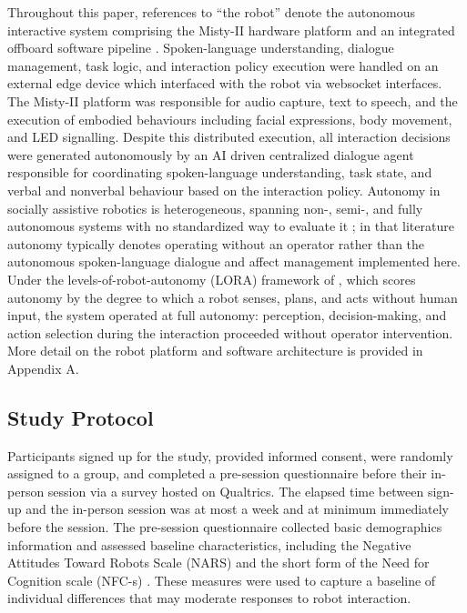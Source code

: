 \documentclass[
  authoryear,
  doubleblind,
  3p]{elsarticle}
\begin{document}
Throughout this paper, references to ``the robot'' denote the autonomous
interactive system comprising the Misty-II hardware platform and an
integrated offboard software pipeline \citep{mistyrobotics}.
Spoken-language understanding, dialogue management, task logic, and
interaction policy execution were handled on an external edge device
which interfaced with the robot via websocket interfaces. The Misty-II
platform was responsible for audio capture, text to speech, and the
execution of embodied behaviours including facial expressions, body
movement, and LED signalling. Despite this distributed execution, all
interaction decisions were generated autonomously by an AI driven
centralized dialogue agent responsible for coordinating spoken-language
understanding, task state, and verbal and nonverbal behaviour based on
the interaction policy. Autonomy in socially assistive robotics is
heterogeneous, spanning non-, semi-, and fully autonomous systems with
no standardized way to evaluate it \citep{maure}; in that literature
autonomy typically denotes operating without an operator rather than the
autonomous spoken-language dialogue and affect management implemented
here. Under the levels-of-robot-autonomy (LORA) framework of
\citet{beer2014}, which scores autonomy by the degree to which a robot
senses, plans, and acts without human input, the system operated at full
autonomy: perception, decision-making, and action selection during the
interaction proceeded without operator intervention. More detail on the
robot platform and software architecture is provided in Appendix A.

\subsection{Study Protocol}\label{study-protocol}

Participants signed up for the study, provided informed consent, were
randomly assigned to a group, and completed a pre-session questionnaire
before their in-person session via a survey hosted on Qualtrics. The
elapsed time between sign-up and the in-person session was at most a
week and at minimum immediately before the session. The pre-session
questionnaire collected basic demographics information and assessed
baseline characteristics, including the Negative Attitudes Toward Robots
Scale (NARS) and the short form of the Need for Cognition scale (NFC-s)
\citep{nomura, cacioppo1982}. These measures were used to capture a
baseline of individual differences that may moderate responses to robot
interaction.
\end{document}
